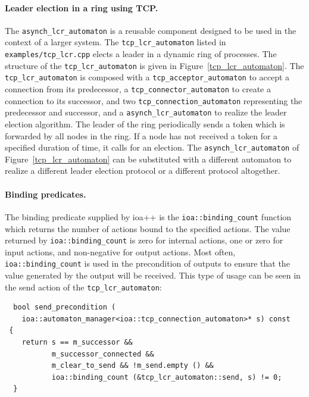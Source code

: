 \paragraph{Leader election in a ring using TCP.}
The \verb+asynch_lcr_automaton+ is a reusable component designed to be used in the context of a larger system.
The \verb+tcp_lcr_automaton+ listed in \verb+examples/tcp_lcr.cpp+ elects a leader in a dynamic ring of processes.
The structure of the \verb+tcp_lcr_automaton+ is given in Figure~\ref{tcp_lcr_automaton}.
The \verb+tcp_lcr_automaton+ is composed with a \verb+tcp_acceptor_automaton+ to accept a connection from its predecessor, a \verb+tcp_connector_automaton+ to create a connection to its successor, and two \verb+tcp_connection_automaton+ representing the predecessor and successor, and a \verb+asynch_lcr_automaton+ to realize the leader election algorithm.
The leader of the ring periodically sends a token which is forwarded by all nodes in the ring.
If a node has not received a token for a specified duration of time, it calls for an election.
The \verb+asynch_lcr_automaton+ of Figure~\ref{tcp_lcr_automaton} can be substituted with a different automaton to realize a different leader election protocol or a different protocol altogether.

\paragraph{Binding predicates.}
The binding predicate supplied by ioa++ is the \verb+ioa::binding_count+ function which returns the number of actions bound to the specified actions.
The value returned by \verb+ioa::binding_count+ is zero for internal actions, one or zero for input actions, and non-negative for output actions.
Most often, \verb+ioa::binding_count+ is used in the precondition of outputs to ensure that the value generated by the output will be received.
This type of usage can be seen in the send action of the \verb+tcp_lcr_automaton+:
\begin{lstlisting}
  bool send_precondition (
    ioa::automaton_manager<ioa::tcp_connection_automaton>* s) const
 {
    return s == m_successor &&
           m_successor_connected &&
           m_clear_to_send && !m_send.empty () &&
           ioa::binding_count (&tcp_lcr_automaton::send, s) != 0;
  }
\end{lstlisting}

